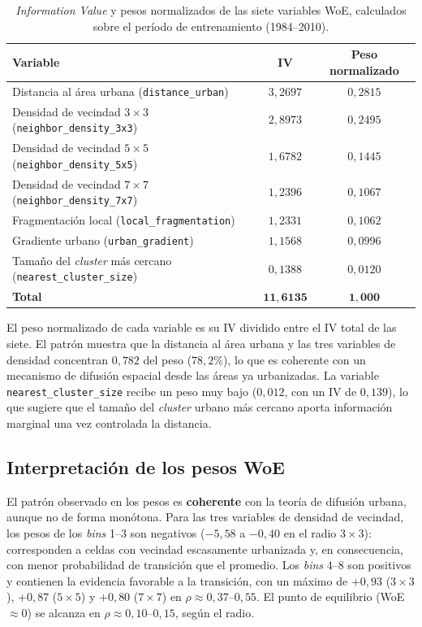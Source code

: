 \begin{table}[htbp]
\centering
\caption{\textit{Information Value} y pesos normalizados de las siete variables WoE, calculados sobre el período de entrenamiento (1984--2010).}
\label{tab:iv_weights}
\begin{tabular}{lcc}
\toprule
\textbf{Variable} & \textbf{IV} & \textbf{Peso normalizado} \\
\midrule
Distancia al área urbana (\texttt{distance\_urban}) & $3{,}2697$ & $0{,}2815$ \\
Densidad de vecindad $3\times3$ (\texttt{neighbor\_density\_3x3}) & $2{,}8973$ & $0{,}2495$ \\
Densidad de vecindad $5\times5$ (\texttt{neighbor\_density\_5x5}) & $1{,}6782$ & $0{,}1445$ \\
Densidad de vecindad $7\times7$ (\texttt{neighbor\_density\_7x7}) & $1{,}2396$ & $0{,}1067$ \\
Fragmentación local (\texttt{local\_fragmentation}) & $1{,}2331$ & $0{,}1062$ \\
Gradiente urbano (\texttt{urban\_gradient}) & $1{,}1568$ & $0{,}0996$ \\
Tamaño del \textit{cluster} más cercano (\texttt{nearest\_cluster\_size}) & $0{,}1388$ & $0{,}0120$ \\
\midrule
\textbf{Total} & $\mathbf{11{,}6135}$ & $\mathbf{1{,}000}$ \\
\bottomrule
\end{tabular}
\end{table}

El peso normalizado de cada variable es su IV dividido entre el IV total de las siete. El patrón muestra que la distancia al área urbana y las tres variables de densidad concentran $0{,}782$ del peso ($78{,}2$\%), lo que es coherente con un mecanismo de difusión espacial desde las áreas ya urbanizadas. La variable \texttt{nearest\_cluster\_size} recibe un peso muy bajo ($0{,}012$, con un IV de $0{,}139$), lo que sugiere que el tamaño del \textit{cluster} urbano más cercano aporta información marginal una vez controlada la distancia.

\subsection{Interpretación de los pesos WoE}

El patrón observado en los pesos es \textbf{coherente} con la teoría de difusión urbana, aunque no de forma monótona. Para las tres variables de densidad de vecindad, los pesos de los \textit{bins} 1--3 son negativos ($-5{,}58$ a $-0{,}40$ en el radio $3\times3$): corresponden a celdas con vecindad escasamente urbanizada y, en consecuencia, con menor probabilidad de transición que el promedio. Los \textit{bins} 4--8 son positivos y contienen la evidencia favorable a la transición, con un máximo de $+0{,}93$ ($3\times3$), $+0{,}87$ ($5\times5$) y $+0{,}80$ ($7\times7$) en $\rho \approx 0{,}37$--$0{,}55$. El punto de equilibrio (WoE $\approx 0$) se alcanza en $\rho \approx 0{,}10$--$0{,}15$, según el radio.

